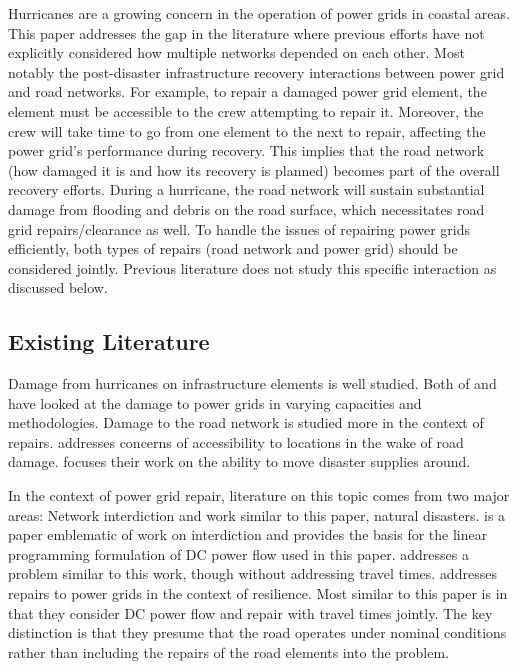 \documentclass[10pt]{article}
\begin{document}
Hurricanes are a growing concern in the operation of power grids in coastal areas. This paper addresses the gap in the literature where previous efforts have not explicitly considered how multiple networks depended on each other. Most notably the post-disaster infrastructure recovery interactions between power grid and road networks. For example, to repair a damaged power grid element, the element must be accessible to the crew attempting to repair it. Moreover, the crew will take time to go from one element to the next to repair, affecting the power grid's performance during recovery. This implies that the road network (how damaged it is and how its recovery is planned) becomes part of the overall recovery efforts. During a hurricane, the road network will sustain substantial damage from flooding and debris on the road surface, which necessitates road grid repairs/clearance as well. To handle the issues of repairing power grids efficiently, both types of repairs (road network and power grid) should be considered jointly. Previous literature does not study this specific interaction as discussed below.
\vspace*{-12pt}
\subsection{\large Existing Literature}
\vspace*{-12pt}
Damage from hurricanes on infrastructure elements is well studied. Both of \cite{WinklerEA2010} and \cite{GuikemaEA2010} have looked at the damage to power grids in varying capacities and methodologies. Damage to the road network is studied more in the context of repairs. \cite{AksuEA2014} addresses concerns of accessibility to locations in the wake of road damage. \cite{DuqueEA2016} focuses their work on the ability to move disaster supplies around.

In the context of power grid repair, literature on this topic comes from two major areas: Network interdiction and work similar to this paper, natural disasters. \cite{SalmeronEA2010} is a paper emblematic of work on interdiction and provides the basis for the linear programming formulation of DC power flow used in this paper.  \cite{NPSMasters} addresses a problem similar to this work, though without addressing travel times. \cite{ArabEA2015} addresses repairs to power grids in the context of resilience. Most similar to this paper is \cite{BentEA2011} in that they consider DC power flow and repair with travel times jointly. The key distinction is that they presume that the road operates under nominal conditions rather than including the repairs of the road elements into the problem.
\vspace*{-12pt}
\end{document}

